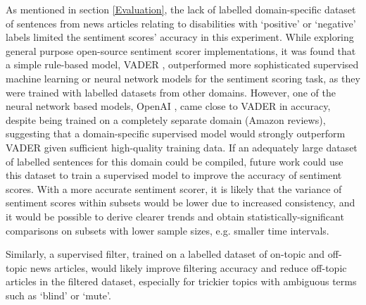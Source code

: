 \documentclass{report}
\begin{document}
As mentioned in section \ref{Evaluation}, the lack of labelled domain-specific dataset of sentences from news articles relating to disabilities with `positive' or `negative' labels limited the sentiment scores' accuracy in this experiment.
While exploring general purpose open-source sentiment scorer implementations, it was found that a simple rule-based model, VADER \cite{VADER}, outperformed more sophisticated supervised machine learning or neural network models for the sentiment scoring task, as they were trained with labelled datasets from other domains.
However, one of the neural network based models, OpenAI \cite{OpenAI}, came close to VADER in accuracy, despite being trained on a completely separate domain (Amazon reviews), suggesting that a domain-specific supervised model would strongly outperform VADER given sufficient high-quality training data.
If an adequately large dataset of labelled sentences for this domain could be compiled, future work could use this dataset to train a supervised model to improve the accuracy of sentiment scores.
With a more accurate sentiment scorer, it is likely that the variance of sentiment scores within subsets would be lower due to increased consistency, and it would be possible to derive clearer trends and obtain statistically-significant comparisons on subsets with lower sample sizes, e.g. smaller time intervals.

Similarly, a supervised filter, trained on a labelled dataset of on-topic and off-topic news articles, would likely improve filtering accuracy and reduce off-topic articles in the filtered dataset, especially for trickier topics with ambiguous terms such as `blind' or `mute'.
\end{document}
